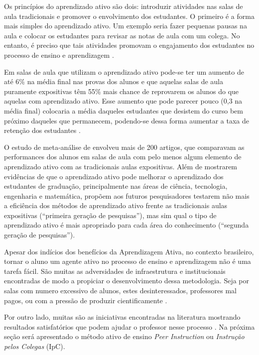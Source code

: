 Os princípios do aprendizado ativo são dois: introduzir atividades nas salas de aula
tradicionais e promover o envolvimento dos estudantes. O primeiro é a forma
mais simples do aprendizado ativo. Um exemplo seria fazer pequenas pausas na aula
e colocar os estudantes para revisar as notas de aula com um colega. No entanto,
é preciso que tais atividades promovam o engajamento dos estudantes no processo
de ensino e aprendizagem \cite[p. 3]{Prince2004}.

Em salas de aula que utilizam o aprendizado ativo pode-se ter um aumento de até 6\%
na média final nas provas dos alunos e que aquelas salas de aula puramente expositivas
têm 55\% mais chance de reprovarem os alunos do que aquelas com aprendizado ativo.
Esse aumento que pode parecer pouco (0,3 na média final) colocaria a média daqueles estudantes
que desistem do curso bem próximo daqueles que permanecem, podendo-se dessa forma aumentar
a taxa de retenção dos estudantes \cite[p. 4]{Freeman2014}.

O estudo de meta-análise de  envolveu mais de 200 artigos,
que comparavam as performances dos alunos em salas de aula com pelo menos algum
elemento de aprendizado ativo com as tradicionais aulas expositivas. Além de
mostrarem evidências de que o aprendizado ativo pode melhorar o aprendizado dos
estudantes de graduação, principalmente nas áreas de ciência, tecnologia, engenharia
e matemática,  propõem aos futuros pesquisadores
testarem não mais a eficiência dos métodos de aprendizado ativo frente as tradicionais
aulas expositivas (``primeira geração de pesquisas''), mas sim qual
o tipo de aprendizado ativo é mais apropriado para cada área do conhecimento
(``segunda geração de pesquisas'').


Apesar dos indícios dos benefícios da Aprendizagem Ativa, no contexto brasileiro,
tornar o aluno um agente ativo no processo de ensino e aprendizagem não é uma tarefa fácil.
São muitas as adversidades de infraestrutura e institucionais
encontradas de modo a propiciar o desenvolvimento dessa metodologia. Seja por salas com
numero excessivo de alunos, estes desinteressados, professores mal pagos, ou com
a pressão de produzir cientificamente \cite{Araujo2013}.

Por outro lado, muitas são as iniciativas encontradas na literatura mostrando resultados
satisfatórios que podem ajudar o professor nesse processo \cite{Crouch2001, Gok2013, Barros2004}.
Na próxima seção será apresentado o método ativo de ensino \textit{Peer Instruction} ou \textit{Instrução pelos Colegas}
(IpC).

